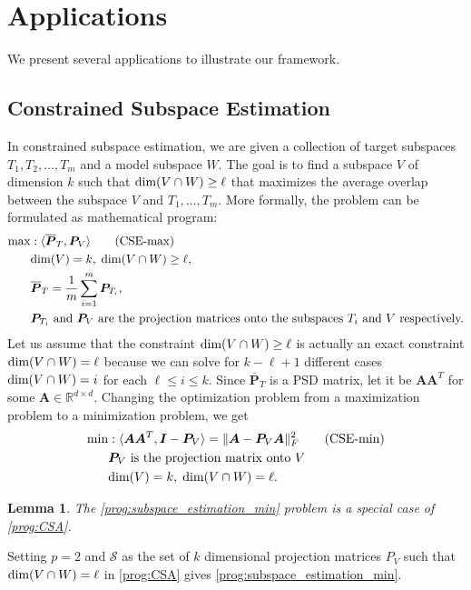 \documentclass[11pt]{article}
\makeatletter
\newcommand{\sumL}{\sum\limits}
\theoremstyle{plain}
\newtheorem{lemma}[theorem]{Lemma}
\theoremstyle{plain}
\theoremstyle{definition}
\theoremstyle{plain}
\theoremstyle{remark}
\newenvironment{proof}[1][\protect\proofname]{\par
	\normalfont\topsep6\p@\@plus6\p@\relax
	\trivlist
	\itemindent\parindent
	\item[\hskip\labelsep\scshape #1]\ignorespaces
}{\endtrivlist\@endpefalse
}
\providecommand{\proofname}{Proof}
\newcommand{\RR}{\mathbb{R}}
\newcommand{\cS}{\mathcal{S}}
\makeatother
\begin{document}
\section{Applications}

We present several applications to illustrate our framework.
\subsection{Constrained Subspace Estimation \cite{santamaria2017constrained}}\label{sec:subspace-estimation}

In constrained subspace estimation, we are given a collection  of target subspaces $T_1,T_2,\dots,T_m$ and a model subspace $W$. The goal is to find a subspace $V$ of dimension $k$ such that $\textnormal{dim}(V \cap W)\geq \ell$ that maximizes the average overlap between the subspace $V$ and $T_1,\dots,T_m$. More formally, the problem can be formulated as mathematical program:
\begin{align}
\label{prog:subspace_estimation_max}
    \max&: \langle \overline{\bm{P}}_T, \bm{P}_V\rangle \tag{CSE-max}\\
    &\textnormal{dim}(V)=k,\;\textnormal{dim}(V \cap W)\geq \ell, \\
    & \overline{\bm{P}}_T =\frac{1}{m}\sumL_{i=1}^m\bm{P}_{T
    _i},\\
    &\bm{P}_{T_i} \textnormal{ and } \bm{P}_V \textnormal{ are the projection matrices onto the subspaces } T_i \textnormal{ and } V \textnormal{ respectively.}
\end{align}
Let us assume that the constraint $\textnormal{dim}(V \cap W)\geq \ell$ is actually an exact constraint $\textnormal{dim}(V \cap W)= \ell$ because we can solve for $k-\ell+1$ different cases $\textnormal{dim}(V \cap W)= i$ for each $\ell \leq i\leq k$. Since $\overline{\bm{P}}_T$ is a PSD matrix, let it be $\bm{A}\bm{A}^T$ for some $\bm{A}\in \RR^{d\times d}$. Changing the optimization problem from a maximization problem to a minimization problem, we get
\begin{align}
\label{prog:subspace_estimation_min}
    \min&: \langle \bm{A}\bm{A}^T, \bm{I}-\bm{P}_V\rangle = \|\bm{A}-\bm{P}_{V}\bm{A}\|_F^2 \tag{CSE-min}\\
    &\bm{P}_V \textnormal{ is the projection matrix onto } V\\
     &\textnormal{dim}(V)=k,\; \textnormal{dim}(V \cap W)= \ell.
\end{align}

\begin{lemma}
   The \ref{prog:subspace_estimation_min} problem is a special case of \ref{prog:CSA}.  
\end{lemma}
\begin{proof}
 Setting $p=2$ and $\cS$ as the set of $k$ dimensional projection matrices $P_V$ such that $\textnormal{dim}(V \cap W)=\ell$ in \ref{prog:CSA} gives \ref{prog:subspace_estimation_min}.
\end{proof}
\end{document}
